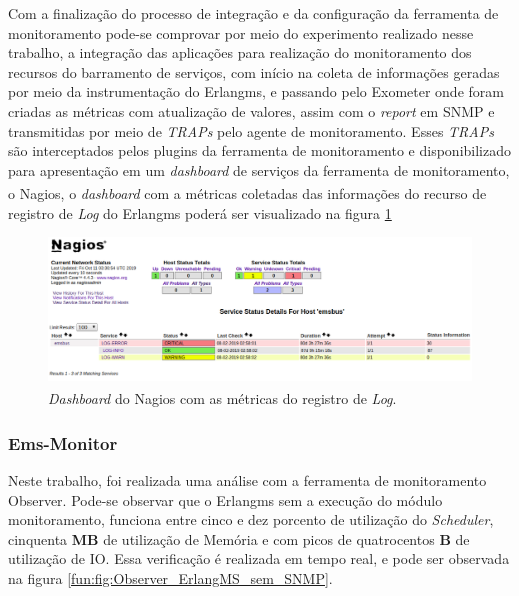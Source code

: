 Com a finalização do processo de integração e da configuração da ferramenta de monitoramento pode-se comprovar por meio do experimento realizado nesse trabalho, a integração das aplicações para realização do monitoramento dos recursos do barramento de serviços, com início na coleta de informações geradas por meio da instrumentação do Erlangms, e passando pelo Exometer onde foram criadas as métricas com atualização de valores, assim com o \textit{report} em \acrshort{SNMP} e transmitidas por meio de \textit{TRAPs} pelo agente de monitoramento. Esses \textit{TRAPs} são interceptados pelos plugins da ferramenta de monitoramento e disponibilizado para apresentação em um \textit{dashboard} de serviços da ferramenta de monitoramento, o Nagios\textsuperscript{\textregistered}, o \textit{dashboard} com a métricas coletadas das informações do recurso de registro de \textit{Log} do Erlangms poderá ser visualizado na figura \ref{fun:fig:nagiosDashbordEmsbus}

\begin{figure}[H]
    \centering
    \includegraphics[scale = 0.57]{img/nagiosConfigurado.png}
    \caption{\textit{Dashboard} do Nagios\textsuperscript{\textregistered} com as métricas do registro de \textit{Log}.}
    \label{fun:fig:nagiosDashbordEmsbus}
\end{figure}

\subsubsection{Ems-Monitor}

Neste trabalho, foi realizada uma análise com a ferramenta de monitoramento Observer. Pode-se observar que o Erlangms sem a execução do módulo monitoramento, funciona entre cinco e dez porcento de utilização do \textit{Scheduler}, cinquenta \textbf{MB} de utilização de Memória e com picos de quatrocentos \textbf{B} de utilização de IO. Essa verificação é realizada em tempo real, e pode ser observada na figura \ref{fun:fig:Observer_ErlangMS_sem_SNMP}.

